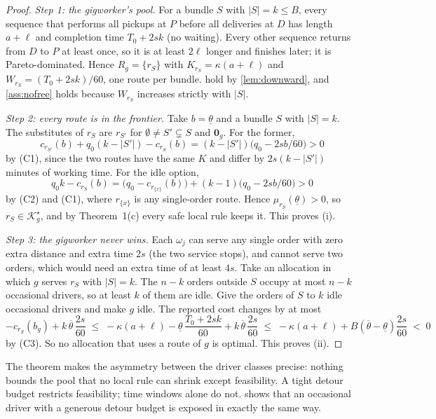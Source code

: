\documentclass[11pt]{article}
\theoremstyle{definition}
\theoremstyle{remark}
\newcommand{\Ks}{\mathcal{K}^{\star}}
\newcommand{\thl}{\underline{\theta}}
\newcommand{\thu}{\overline{\theta}}
\newcommand{\idle}{\mathbf{0}}
\begin{document}
\begin{proof}
\emph{Step 1: the gigworker's pool.} For a bundle $S$ with $|S|=k\le B$, every
sequence that performs all pickups at $P$ before all deliveries at $D$ has
length $a+\ell$ and completion time $T_0+2sk$ (no waiting). Every other sequence
returns from $D$ to $P$ at least once, so it is at least $2\ell$ longer and
finishes later; it is Pareto-dominated. Hence $R_g=\{r_S\}$ with
$K_{r_S}=\kappa(a+\ell)$ and $W_{r_S}=(T_0+2sk)/60$, one route per bundle.
 hold by \cref{lem:downward}, and \cref{ass:nofree}
holds because $W_{r_S}$ increases strictly with $|S|$.

\emph{Step 2: every route is in the frontier.} Take $b=\thl$ and a bundle $S$
with $|S|=k$. The substitutes of $r_S$ are $r_{S'}$ for
$\emptyset\ne S'\subsetneq S$ and $\idle_g$. For the former,
\[
c_{r_{S'}}(b)+q_0(k-|S'|)-c_{r_S}(b)=(k-|S'|)\bigl(q_0-2sb/60\bigr)>0
\]
by (C1), since the two routes have the same $K$ and differ by $2s(k-|S'|)$
minutes of working time. For the idle option,
\[
q_0k-c_{r_S}(b)=\bigl(q_0-c_{r_{\{x\}}}(b)\bigr)+(k-1)\bigl(q_0-2sb/60\bigr)>0
\]
by (C2) and (C1), where $r_{\{x\}}$ is any single-order route. Hence
$\mu_{r_S}(\thl)>0$, so $r_S\in\Ks_g$, and by Theorem~1(c) every safe local
rule keeps it. This proves (i).

\emph{Step 3: the gigworker never wins.} Each $\omega_j$ can serve any single
order with zero extra distance and extra time $2s$ (the two service stops), and
cannot serve two orders, which would need an extra time of at least $4s$. Take
an allocation in which $g$ serves $r_S$ with $|S|=k$. The $n-k$ orders outside
$S$ occupy at most $n-k$ occasional drivers, so at least $k$ of them are idle.
Give the orders of $S$ to $k$ idle occasional drivers and make $g$ idle. The
reported cost changes by at most
\[
-c_{r_S}(b_g)+k\,\thu\,\frac{2s}{60}
\;\le\;-\kappa(a+\ell)-\thl\,\frac{T_0+2sk}{60}+k\,\thu\,\frac{2s}{60}
\;\le\;-\kappa(a+\ell)+B(\thu-\thl)\frac{2s}{60}\;<\;0
\]
by (C3). So no allocation that uses a route of $g$ is optimal. This proves (ii).
\end{proof}

The theorem makes the asymmetry between the driver classes precise: nothing
bounds the pool that no local rule can shrink except feasibility. A tight
detour budget restricts feasibility; time windows alone do not.
 shows that an occasional driver with a generous detour budget
is exposed in exactly the same way.

\FloatBarrier
\end{document}
